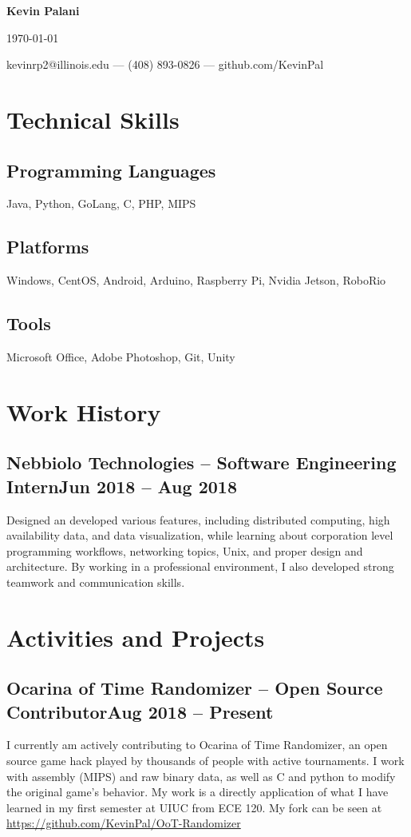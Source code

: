 \documentclass[letterpaper,12pt]{article}
\makeatletter
\newcommand\textbox[1]{%
	\parbox{.333\textwidth}{#1}%
}
\renewcommand{\maketitle}{
	\begin{center}
		\noindent\textbox{\hfill}\textbox{\hfil\bfseries\huge Kevin Palani\hfil}\textbox{\hfill \today}
		{kevinrp2@illinois.edu --- (408) 893-0826 --- github.com/KevinPal}
	\end{center} }
\makeatother
\begin{document}
\maketitle
\section{Technical Skills}
\subsection{Programming Languages}
Java, Python, GoLang, C, PHP, MIPS
\vspace*{-4mm}
\subsection{Platforms}
Windows, CentOS, Android, Arduino, Raspberry Pi, Nvidia Jetson, RoboRio
\vspace*{-4mm}
\subsection{Tools}
Microsoft Office, Adobe Photoshop, Git, Unity
\vspace*{-4mm}
\section{Work History}
\subsection{Nebbiolo Technologies -- Software Engineering Intern\null\hfill Jun 2018 -- Aug 2018}
Designed an developed various features, including distributed computing, high availability data, and data visualization, while learning about corporation level programming workflows, networking topics, Unix, and proper design and architecture.
By working in a professional environment, I also developed strong teamwork and communication skills.
\vspace*{-2mm}
\section{Activities and Projects}
\subsection{Ocarina of Time Randomizer -- Open Source Contributor\null\hfill Aug 2018 -- Present}
I currently am actively contributing to Ocarina of Time Randomizer, an open source game hack played by thousands of people with active tournaments. I work with assembly (MIPS) and raw binary data, as well as C and python to modify the original game's behavior.
My work is a directly application of what I have learned in my first semester at UIUC from ECE 120.
My fork can be seen at \\\underline{https://github.com/KevinPal/OoT-Randomizer}
\vspace*{-2mm}
\end{document}
